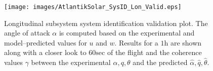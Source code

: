%
\begin{figure}[htbp]
\centering
  \texttt{[image: images/AtlantikSolar\_SysID\_Lon\_Valid.eps]}
\caption{Longitudinal subsystem system identification validation plot. The angle of attack $\alpha$ is computed based on the experimental and model--predicted values for $u$ and $w$. Results for a $1\textrm{h}$ are shown along with a closer look to $60\textrm{sec}$ of the flight and the coherence values $\gamma$ between the experimental $\alpha,q,\theta$ and the predicted $\hat{\alpha},\hat{q},\hat{\theta}$. }
\label{SysID_LonValid}
\end{figure}
% 